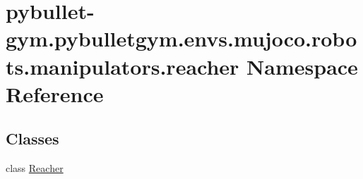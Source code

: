 \hypertarget{namespacepybullet-gym_1_1pybulletgym_1_1envs_1_1mujoco_1_1robots_1_1manipulators_1_1reacher}{}\section{pybullet-\/gym.pybulletgym.\+envs.\+mujoco.\+robots.\+manipulators.\+reacher Namespace Reference}
\label{namespacepybullet-gym_1_1pybulletgym_1_1envs_1_1mujoco_1_1robots_1_1manipulators_1_1reacher}
\subsection*{Classes}
\begin{DoxyCompactItemize}
\item 
class \hyperlink{classpybullet-gym_1_1pybulletgym_1_1envs_1_1mujoco_1_1robots_1_1manipulators_1_1reacher_1_1_reacher}{Reacher}
\end{DoxyCompactItemize}
